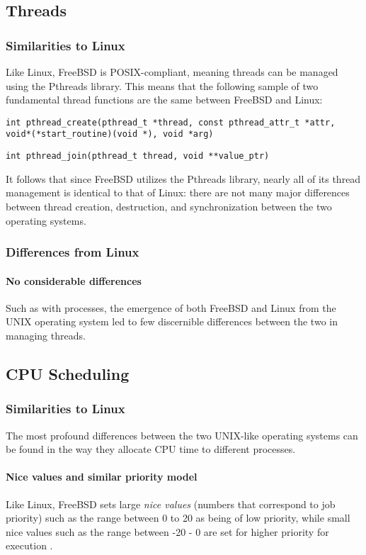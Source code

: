 \documentclass[letterpaper,10pt,titlepage]{article}
\begin{document}
\subsection{Threads}
\subsubsection{Similarities to Linux}
Like Linux, FreeBSD is POSIX-compliant, meaning threads can be managed using the Pthreads library. This means that the following sample of two fundamental thread functions are the same between FreeBSD and Linux:
\begin{lstlisting}
int pthread_create(pthread_t *thread, const pthread_attr_t *attr, void*(*start_routine)(void *), void *arg)
\end{lstlisting}
\begin{lstlisting}
int pthread_join(pthread_t thread, void **value_ptr)
\end{lstlisting}
It follows that since FreeBSD utilizes the Pthreads library, nearly all of its thread management is identical to that of Linux: there are not many major differences between thread creation, destruction, and synchronization between the two operating systems.
\subsubsection{Differences from Linux}
\paragraph{No considerable differences} Such as with processes, the emergence of both FreeBSD and Linux from the UNIX operating system led to few discernible differences between the two in managing threads. 
\subsection{CPU Scheduling}
\subsubsection{Similarities to Linux}
The most profound differences between the two UNIX-like operating systems can be found in the way they allocate CPU time to different processes. 
\paragraph{Nice values and similar priority model} Like Linux, FreeBSD sets large \emph{nice values} (numbers that correspond to job priority) such as the range between 0 to 20 as being of low priority, while small nice values such as the range between -20 - 0 are set for higher priority for execution \cite{boe01}. 
\end{document}
